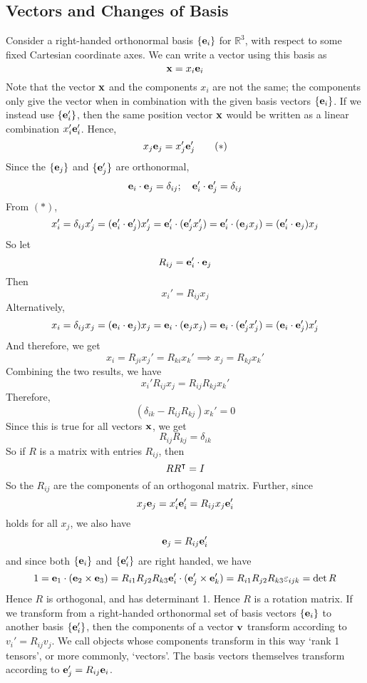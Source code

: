 \documentclass{article}
\begin{document}
\subsection{Vectors and Changes of Basis}
Consider a right-handed orthonormal basis $\{ \vb e_i \}$ for $\mathbb R^3$, with respect to some fixed Cartesian coordinate axes. We can write a vector using this basis as
\[ \vb x = x_i \vb e_i \]
Note that the vector $\vb x$ and the components $x_i$ are not the same; the components only give the vector when in combination with the given basis vectors $\{ \vb e_i \}$. If we instead use $\{ \vb e'_i \}$, then the same position vector $\vb x$ would be written as a linear combination $x'_i \vb e'_i$. Hence,
\begin{equation}
    x_j \vb e_j = x'_j \vb e'_j
    \tag{$\ast$}
\end{equation}
Since the $\{ \vb e_j \}$ and $\{ \vb e'_j \}$ are orthonormal,
\[ \vb e_i \cdot \vb e_j = \delta_{ij};\quad \vb e'_i \cdot \vb e'_j = \delta_{ij} \]
From $(\ast)$,
\[ x_i' = \delta_{ij} x_j' = (\vb e_i' \cdot \vb e_j') x_j' = \vb e_i' \cdot (\vb e_j' x_j') = \vb e_i' \cdot (\vb e_j x_j) = (\vb e_i' \cdot \vb e_j) x_j \]
So let
\[ R_{ij} = \vb e_i' \cdot \vb e_j \]
Then
\[ x_i' = R_{ij} x_j \]
Alternatively,
\[ x_i = \delta_{ij} x_j = (\vb e_i \cdot \vb e_j) x_j = \vb e_i \cdot (\vb e_j x_j) = \vb e_i \cdot (\vb e_j' x_j') = (\vb e_i \cdot \vb e_j') x_j' \]
And therefore, we get
\[ x_i = R_{ji} x_j' = R_{ki} x_k' \implies x_j = R_{kj} x_k' \]
Combining the two results, we have
\[ x_i' R_{ij} x_j = R_{ij} R_{kj} x_k' \]
Therefore,
\[ (\delta_{ik} - R_{ij}R_{kj}) x_k' = 0 \]
Since this is true for all vectors $\vb x$, we get
\[ R_{ij}R_{kj} = \delta_{ik} \]
So if $R$ is a matrix with entries $R_{ij}$, then
\[ R R^\intercal = I \]
So the $R_{ij}$ are the components of an orthogonal matrix. Further, since
\[ x_j \vb e_j = x_i' \vb e_i' = R_{ij} x_j \vb e_i' \]
holds for all $x_j$, we also have
\[ \vb e_j = R_{ij} \vb e_i' \]
and since both $\{ \vb e_i \}$ and $\{ \vb e_i' \}$ are right handed, we have
\[ 1 = \vb e_1 \cdot (\vb e_2 \times \vb e_3) = R_{i1} R_{j2} R_{k3} \vb e_i' \cdot (\vb e_j' \times \vb e_k') = R_{i1} R_{j2} R_{k3} \varepsilon_{ijk} = \det R \]
Hence $R$ is orthogonal, and has determinant 1. Hence $R$ is a rotation matrix. If we transform from a right-handed orthonormal set of basis vectors $\{ \vb e_i \}$ to another basis $\{ \vb e_i' \}$, then the components of a vector $\vb v$ transform according to $v_i' = R_{ij} v_j$. We call objects whose components transform in this way `rank 1 tensors', or more commonly, `vectors'. The basis vectors themselves transform according to $\vb e_j' = R_{ij} \vb e_i$.
\end{document}
